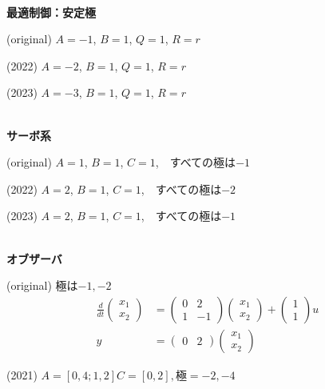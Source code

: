\documentclass[a4paper,11pt,fleqn]{jreport}
\begin{document}
\ \\ \noindent
{\bf 最適制御：安定極}

(original)
$A=-1$, $B=1$, $Q=1$, $R=r$

(2022)
{\color{red}$A=-2$}, $B=1$, $Q=1$, $R=r$

(2023)
{\color{red}$A=-3$}, $B=1$, $Q=1$, $R=r$

\ \\ \noindent
{\bf サーボ系}

(original)
$A=1$, $B=1$, $C=1$,　すべての極は$-1$

(2022)
{\color{red}$A=2$}, $B=1$, $C=1$,　すべての極は{\color{red}$-2$}

(2023)
{\color{red}$A=2$}, $B=1$, $C=1$,　すべての極は{\color{red}$-1$}

\ \\ \noindent
{\bf オブザーバ}

(original) 極は$-1, -2$
\begin{align*}
	\frac{d}{dt}
	\left (
	\begin{array}{c}
	 x_1 \\ x_2 
	\end{array}
	\right )
	& = 
	\left (
	\begin{array}{cc}
	 0 & 2 \\
	 1 & -1
	\end{array}
	\right )
	\left (
	\begin{array}{c}
	 x_1 \\ x_2 
	\end{array}
	\right )
	+
	\left (
	\begin{array}{c}
	 1 \\ 1 
	\end{array}
	\right )
	u
\\
	y&=
	\left ( \begin{array}{cc}
		0 & 2 
	\end{array} \right )
	\left (	\begin{array}{c}
		x_1 \\ x_2 
	\end{array} \right )
\end{align*}

(2021) $A=[0,4;1,2] C=[0,2], 極=-2,-4$
\end{document}
